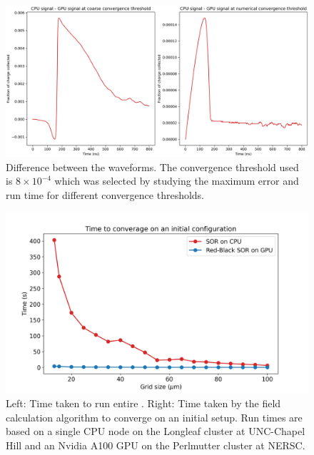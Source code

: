 \begin{figure}
\centering
 \includegraphics[width=0.99\linewidth]{ch4/figs/converge_threshold_dif.png}
\caption{Difference between the waveforms. The convergence threshold used is $8\times10^{-4}$ which was selected by studying the maximum error and run time for different convergence thresholds.}
\label{fig:cov_thres_diff} 
\end{figure}


\begin{figure}
\centering
 \includegraphics[width=0.99\linewidth]{ch4/figs/sor_cpu_gpu_comp.png}
\caption{\label{fig:sor_run_time} Left: Time taken to run entire {\tdsim}. Right: Time taken by the field calculation algorithm to converge on an initial setup. Run times are based on a single CPU node on the Longleaf cluster at UNC-Chapel Hill and an Nvidia A100 GPU on the Perlmutter cluster at NERSC.}
\end{figure}



